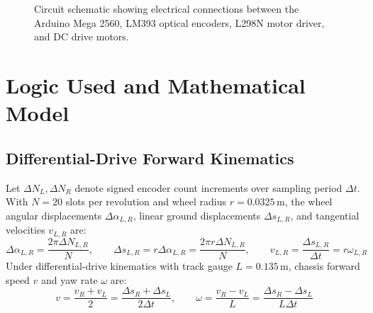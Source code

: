 \documentclass[11pt,a4paper]{article}
\begin{document}
\begin{figure}[H]
{%
}
\caption{Circuit schematic showing electrical connections between the Arduino Mega 2560, LM393 optical encoders, L298N motor driver, and DC drive motors.}
\label{fig_wiring_diagram}
\end{figure}

\newpage
\section{Logic Used and Mathematical Model}

\subsection{Differential-Drive Forward Kinematics}
Let $\Delta N_L, \Delta N_R$ denote signed encoder count increments over sampling period $\Delta t$. With $N = 20$ slots per revolution and wheel radius $r = 0.0325\,\text{m}$, the wheel angular displacements $\Delta \alpha_{L,R}$, linear ground displacements $\Delta s_{L,R}$, and tangential velocities $v_{L,R}$ are:
\begin{equation}
    \Delta \alpha_{L,R} = \frac{2\pi \Delta N_{L,R}}{N}, \qquad \Delta s_{L,R} = r \Delta \alpha_{L,R} = \frac{2\pi r \Delta N_{L,R}}{N}, \qquad v_{L,R} = \frac{\Delta s_{L,R}}{\Delta t} = r \omega_{L,R}
    \label{eq_wheel_kinematics}
\end{equation}
Under differential-drive kinematics with track gauge $L = 0.135\,\text{m}$, chassis forward speed $v$ and yaw rate $\omega$ are:
\begin{equation}
    v = \frac{v_R + v_L}{2} = \frac{\Delta s_R + \Delta s_L}{2\Delta t}, \qquad \omega = \frac{v_R - v_L}{L} = \frac{\Delta s_R - \Delta s_L}{L\Delta t}
    \label{eq_body_vel}
\end{equation}
\end{document}
